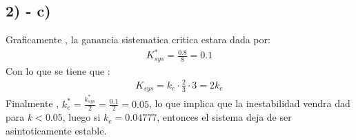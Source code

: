 \documentclass[
  11pt,
  letterpaper,
   addpoints,
   answers
  ]{exam}
\begin{document}
\begin{questions}
\begin{solution}
\subsection*{2) - c)}
Graficamente , la ganancia sistematica critica estara dada por:
\begin{align}
    K^{*}_{sys} = \frac{0.8}{8} = 0.1  
\end{align}
Con lo que se tiene que :
\begin{align}
    K_{sys} = k_{e} \cdot \frac{2}{3} \cdot 3 = 2k_{e}
\end{align}
Finalmente , $k^{*}_{e} =\frac{k^{*}_{sys}}{2} = \frac{0.1}{2} = 0.05$, lo que implica que la inestabilidad vendra dad para $k<0.05$, luego si $k_{e} = 0.04777$, entonces el sistema deja de ser asintoticamente estable.
\end{solution}


\end{questions}
\newpage
\end{document}
